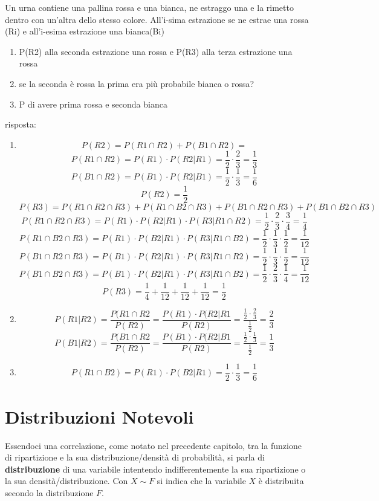 \documentclass[a4paper,12pt, oneside]{book}
\begin{document}
\begin{esercizio}
Un urna contiene una pallina rossa e una bianca, ne estraggo una e la rimetto dentro con un'altra dello stesso colore. All'i-sima estrazione se ne estrae una rossa (Ri) e all'i-esima estrazione una bianca(Bi)
\begin{enumerate}
\item P(R2) alla seconda estrazione una rossa e P(R3) alla terza estrazione una rossa
\item se la seconda è rossa la prima era più probabile bianca o rossa?
\item P di avere prima rossa e seconda bianca
\end{enumerate}
risposta:
\begin{enumerate}
\item \[P(R2)=P(R1\cap R2)+P(B1\cap R2)=\]
\[P(R1\cap R2)=P(R1)\cdot P(R2|R1)= \frac{1}{2}\cdot \frac{2}{3}=\frac{1}{3}\]
\[P(B1\cap R2)=P(B1)\cdot P(R2|B1)=\frac{1}{2}\cdot \frac{1}{3}=\frac{1}{6}\]
\[P(R2)=\frac{1}{2}\]
\[P(R3)=P(R1\cap R2\cap R3)+P(R1\cap B2\cap R3)+P(B1\cap R2\cap R3)+P(B1\cap B2\cap R3)\]
\[P(R1\cap R2\cap R3)=P(R1)\cdot P(R2|R1)\cdot P(R3|R1\cap R2)=\frac{1}{2}\cdot \frac{2}{3}\cdot \frac{3}{4}=\frac{1}{4}\]
\[P(R1\cap B2\cap R3)=P(R1)\cdot P(B2|R1)\cdot P(R3|R1\cap B2)=\frac{1}{2}\cdot \frac{1}{3}\cdot \frac{1}{2}=\frac{1}{12}\]
\[P(B1\cap R2\cap R3)=P(B1)\cdot P(R2|R1)\cdot P(R3|R1\cap R2)=\frac{1}{2}\cdot \frac{1}{3}\cdot \frac{1}{2}=\frac{1}{12}\]
\[P(B1\cap B2\cap R3)=P(B1)\cdot P(B2|R1)\cdot P(R3|R1\cap B2)=\frac{1}{2}\cdot \frac{2}{3}\cdot \frac{1}{4}=\frac{1}{12}\]
\[P(R3)=\frac{1}{4}+\frac{1}{12}+\frac{1}{12}+\frac{1}{12}=\frac{1}{2}\]
\item \[P(R1|R2)=\frac{P(R1\cap R2}{P(R2)}=\frac{P(R1)\cdot P(R2|R1}{P(R2)}=\frac{\frac{1}{2}\cdot \frac{2}{3}}{\frac{1}{2}}=\frac{2}{3}\]
\[P(B1|R2)=\frac{P(B1\cap R2}{P(R2)}=\frac{P(B1)\cdot P(R2|B1}{P(R2)}=\frac{\frac{1}{2}\cdot \frac{1}{3}}{\frac{1}{2}}=\frac{1}{3}\]
\item \[P(R1\cap B2)=P(R1)\cdot P(B2|R1)=\frac{1}{2}\cdot \frac{1}{3}=\frac{1}{6}\]
\end{enumerate}
\end{esercizio}

\chapter{Distribuzioni Notevoli}
Essendoci una correlazione, come notato nel precedente capitolo, tra la funzione di ripartizione e
la sua distribuzione/densità di probabilità, si parla di \textbf{distribuzione} di una variabile
intentendo indifferentemente la sua ripartizione o la sua densità/distribuzione.\newline
Con $X \sim F$ si indica che la variabile $X$ è distribuita secondo la distribuzione $F$.
\end{document}
